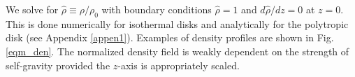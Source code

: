 
We solve for $\hat{\rho}\equiv\rho/\rho_0$ with 
boundary conditions $\hat{\rho}=1$ and $d\hat{\rho}/dz=0$  at $z=0$. This
is done numerically for isothermal disks and analytically for the
polytropic disk (see Appendix \ref{appen1}). Examples of density
profiles are shown in Fig. \ref{eqm_den}. The normalized density field
is weakly dependent on the strength of self-gravity provided the
$z$-axis is appropriately scaled. 



